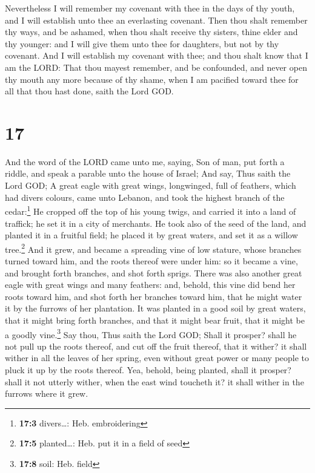  Nevertheless I will remember my covenant with thee in
the days of thy youth, and I will establish unto thee an everlasting
covenant.  Then thou shalt remember thy ways, and be
ashamed, when thou shalt receive thy sisters, thine elder and thy
younger: and I will give them unto thee for daughters, but not by thy
covenant.  And I will establish my covenant with thee;
and thou shalt know that I am the LORD:  That thou mayest
remember, and be confounded, and never open thy mouth any more because
of thy shame, when I am pacified toward thee for all that thou hast
done, saith the Lord GOD.

\hypertarget{section-16}{%
\section{17}\label{section-16}}

 And the word of the LORD came unto me, saying,
 Son of man, put forth a riddle, and speak a parable unto
the house of Israel;  And say, Thus saith the Lord GOD; A
great eagle with great wings, longwinged, full of feathers, which had
divers colours, came unto Lebanon, and took the highest branch of the
cedar:\footnote{\textbf{17:3} divers\ldots: Heb. embroidering}
 He cropped off the top of his young twigs, and carried it
into a land of traffick; he set it in a city of merchants.
 He took also of the seed of the land, and planted it in a
fruitful field; he placed it by great waters, and set it as a willow
tree.\footnote{\textbf{17:5} planted\ldots: Heb. put it in a field of
  seed}  And it grew, and became a spreading vine of low
stature, whose branches turned toward him, and the roots thereof were
under him: so it became a vine, and brought forth branches, and shot
forth sprigs.  There was also another great eagle with
great wings and many feathers: and, behold, this vine did bend her roots
toward him, and shot forth her branches toward him, that he might water
it by the furrows of her plantation.  It was planted in a
good soil by great waters, that it might bring forth branches, and that
it might bear fruit, that it might be a goodly vine.\footnote{\textbf{17:8}
  soil: Heb. field}  Say thou, Thus saith the Lord GOD;
Shall it prosper? shall he not pull up the roots thereof, and cut off
the fruit thereof, that it wither? it shall wither in all the leaves of
her spring, even without great power or many people to pluck it up by
the roots thereof.  Yea, behold, being planted, shall it
prosper? shall it not utterly wither, when the east wind toucheth it? it
shall wither in the furrows where it grew.

